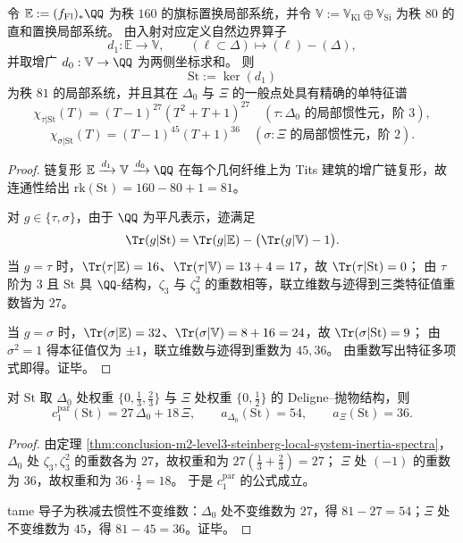 \begin{theorem}\label{thm:conclusion-m2-level3-steinberg-local-system-inertia-spectra}
令 \(\mathbb E:=(f_{\mathrm{Fl}})_\ast\QQ\) 为秩 \(160\) 的旗标置换局部系统，并令
\(
\mathbb V:=\mathbb V_{\mathrm{Kl}}\oplus \mathbb V_{\mathrm{Si}}
\)
为秩 \(80\) 的直和置换局部系统。
由入射对应定义自然边界算子
\[
d_1:\mathbb E\longrightarrow \mathbb V,\qquad
(\ell\subset \Delta)\longmapsto (\ell)-(\Delta),
\]
并取增广 \(d_0:\mathbb V\to \QQ\) 为两侧坐标求和。
则
\[
\mathrm{St}:=\ker(d_1)
\]
为秩 \(81\) 的局部系统，并且其在 \(\Delta_0\) 与 \(\Xi\) 的一般点处具有精确的单特征谱
\[
\chi_{\tau|\mathrm{St}}(T)=(T-1)^{27}(T^2+T+1)^{27}
\quad (\tau:\Delta_0\text{ 的局部惯性元，阶 }3),
\]
\[
\chi_{\sigma|\mathrm{St}}(T)=(T-1)^{45}(T+1)^{36}
\quad (\sigma:\Xi\text{ 的局部惯性元，阶 }2).
\]
\end{theorem}
\begin{proof}
链复形
\(
\mathbb E\xrightarrow{d_1}\mathbb V\xrightarrow{d_0}\QQ
\)
在每个几何纤维上为 Tits 建筑的增广链复形，故连通性给出
\(
\mathrm{rk}(\mathrm{St})=160-80+1=81
\)。
\par
对 \(g\in\{\tau,\sigma\}\)，由于 \(\QQ\) 为平凡表示，迹满足
\[
\Tr(g|\mathrm{St})=\Tr(g|\mathbb E)-\bigl(\Tr(g|\mathbb V)-1\bigr).
\]
当 \(g=\tau\) 时，\(\Tr(\tau|\mathbb E)=16\)、\(\Tr(\tau|\mathbb V)=13+4=17\)，故 \(\Tr(\tau|\mathrm{St})=0\)；
由 \(\tau\) 阶为 \(3\) 且 \(\mathrm{St}\) 具 \(\QQ\)-结构，\(\zeta_3\) 与 \(\zeta_3^2\) 的重数相等，联立维数与迹得到三类特征值重数皆为 \(27\)。
\par
当 \(g=\sigma\) 时，\(\Tr(\sigma|\mathbb E)=32\)、\(\Tr(\sigma|\mathbb V)=8+16=24\)，故 \(\Tr(\sigma|\mathrm{St})=9\)；
由 \(\sigma^2=1\) 得本征值仅为 \(\pm1\)，联立维数与迹得到重数为 \(45,36\)。
由重数写出特征多项式即得。证毕。
\end{proof}

\begin{corollary}\label{cor:conclusion-m2-level3-steinberg-parabolic-c1-artin}
对 \(\mathrm{St}\) 取 \(\Delta_0\) 处权重 \(\{0,\tfrac13,\tfrac23\}\) 与 \(\Xi\) 处权重 \(\{0,\tfrac12\}\) 的 Deligne--抛物结构，则
\[
c_1^{\mathrm{par}}(\mathrm{St})=27\,\Delta_0+18\,\Xi,
\qquad
a_{\Delta_0}(\mathrm{St})=54,
\qquad
a_{\Xi}(\mathrm{St})=36.
\]
\end{corollary}
\begin{proof}
由定理 \ref{thm:conclusion-m2-level3-steinberg-local-system-inertia-spectra}，\(\Delta_0\) 处 \(\zeta_3,\zeta_3^2\) 的重数各为 \(27\)，故权重和为 \(27(\tfrac13+\tfrac23)=27\)；
\(\Xi\) 处 \((-1)\) 的重数为 \(36\)，故权重和为 \(36\cdot\tfrac12=18\)。
于是 \(c_1^{\mathrm{par}}\) 的公式成立。
\par
tame 导子为秩减去惯性不变维数：\(\Delta_0\) 处不变维数为 \(27\)，得 \(81-27=54\)；\(\Xi\) 处不变维数为 \(45\)，得 \(81-45=36\)。证毕。
\end{proof}


